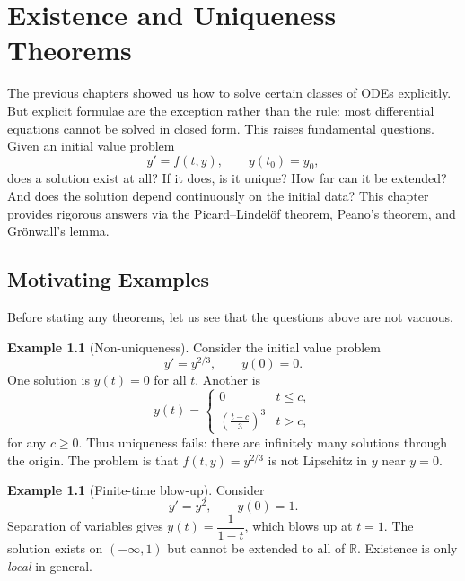 \documentclass[12pt,a4paper,openany]{book}
\theoremstyle{definition}
\newtheorem{example}[definition]{Example}
\theoremstyle{plain}
\theoremstyle{remark}
\newcommand{\R}{\mathbb{R}}
\begin{document}
\chapter{Existence and Uniqueness Theorems}\label{ch:existence-uniqueness}

The previous chapters showed us how to solve certain classes of ODEs explicitly.
But explicit formulae are the exception rather than the rule: most differential
equations cannot be solved in closed form. This raises fundamental questions.
Given an initial value problem
\[
  y' = f(t,y), \qquad y(t_0) = y_0,
\]
does a solution exist at all? If it does, is it unique? How far can it be
extended? And does the solution depend continuously on the initial data?
This chapter provides rigorous answers via the Picard--Lindel\"of theorem,
Peano's theorem, and Gr\"onwall's lemma.

\section{Motivating Examples}\label{sec:exist-motivation}

Before stating any theorems, let us see that the questions above are not
vacuous.

\begin{example}[Non-uniqueness]\label{ex:non-unique-y23}
Consider the initial value problem
\[
  y' = y^{2/3}, \qquad y(0) = 0.
\]
One solution is $y(t) = 0$ for all $t$. Another is
\[
  y(t) = \begin{cases} 0 & t \le c, \\[4pt]
  \displaystyle\left(\frac{t-c}{3}\right)^{3} & t > c,
  \end{cases}
\]
for any $c \ge 0$. Thus uniqueness fails: there are infinitely many solutions
through the origin. The problem is that $f(t,y) = y^{2/3}$ is not Lipschitz
in $y$ near $y = 0$.
\end{example}

\begin{example}[Finite-time blow-up]\label{ex:blowup-y2}
Consider
\[
  y' = y^2, \qquad y(0) = 1.
\]
Separation of variables gives $y(t) = \dfrac{1}{1-t}$, which blows up at
$t = 1$. The solution exists on $(-\infty, 1)$ but cannot be extended to all
of $\R$. Existence is only \emph{local} in general.
\end{example}
\end{document}
